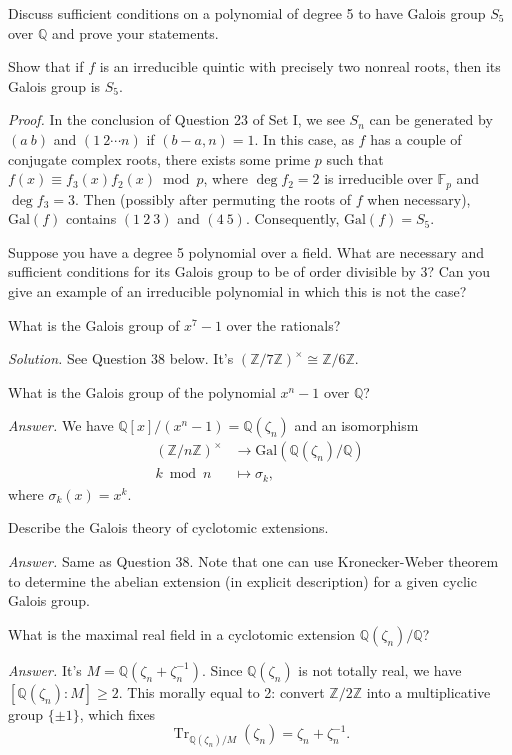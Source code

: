 \documentclass{mathproblems}
\newcommand\F{\mathbb{F}}
\newcommand\Q{\mathbb{Q}}
\newcommand\Z{\mathbb{Z}}
\newcommand\Gal{\mathrm{Gal}}
\begin{document}
\begin{questions}
\miquestion
{\color{blue} Discuss sufficient conditions on a polynomial of degree 5 to have Galois group $S_{5}$ over $\Q$ and prove your statements.}

\miquestion
{\color{blue} Show that if $f$ is an irreducible quintic with precisely two nonreal roots, then its Galois group is $S_{5}$.}

\textit{Proof.} In the conclusion of Question 23 of Set I, we see $S_n$ can be generated by $(a\ b)$ and $(1\ 2 \cdots n)$ if $(b-a,n)=1$. In this case, as $f$ has a couple of conjugate complex roots, there exists some prime $p$ such that $f(x)\equiv f_3(x)f_2(x)\bmod p$, where $\deg f_2=2$ is irreducible over $\F_p$ and $\deg f_3=3$. Then (possibly after permuting the roots of $f$ when necessary), $\Gal(f)$ contains $(1\ 2\ 3)$ and $(4\ 5)$. Consequently, $\Gal(f)=S_5$.

\miquestion
{\color{blue} Suppose you have a degree 5 polynomial over a field. What are necessary and sufficient conditions for its Galois group to be of order divisible by 3? Can you give an example of an irreducible polynomial in which this is not the case?}

\miquestion
{\color{blue} What is the Galois group of $x^{7}-1$ over the rationals?}

\textit{Solution.} See Question 38 below. It's $(\Z/7\Z)^\times\cong \Z/6\Z$.

\miquestion
{\color{blue} What is the Galois group of the polynomial $x^{n}-1$ over $\Q$?}

\textit{Answer.} We have $\Q[x]/(x^n-1)=\Q(\zeta_n)$ and an isomorphism
$$
\begin{aligned}
(\Z/n\Z)^\times & \longrightarrow \Gal(\Q(\zeta_n)/\Q) \\
k \bmod n & \longmapsto \sigma_k,
\end{aligned}
$$
where $\sigma_k(x)=x^k$.

\miquestion
{\color{blue} Describe the Galois theory of cyclotomic extensions.}

\textit{Answer.}
Same as Question 38. Note that one can use Kronecker-Weber theorem to determine the abelian extension (in explicit description) for a given cyclic Galois group.

\miquestion
{\color{blue} What is the maximal real field in a cyclotomic extension $\Q(\zeta_{n}) / \Q$?}

\textit{Answer.} It's $M=\Q(\zeta_{n}+\zeta_{n}^{-1})$. Since $\Q(\zeta_{n})$ is not totally real, we have $[\Q(\zeta_{n}):M]\geq 2$. This morally equal to 2: convert $\Z/2\Z$ into a multiplicative group $\{\pm 1\}$, which fixes
$$
\operatorname{Tr}_{\Q(\zeta_{n})/M}(\zeta_n)=\zeta_{n}+\zeta_{n}^{-1}.
$$


\end{questions}
\end{document}
